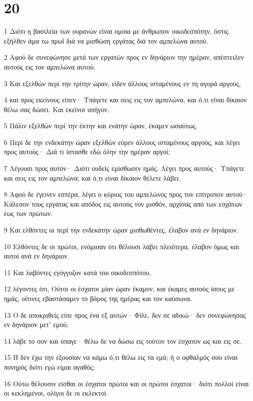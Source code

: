 \chapter{20}

\par 1 Διότι η βασιλεία των ουρανών είναι ομοία με άνθρωπον οικοδεσπότην, όστις εξήλθεν άμα τω πρωΐ διά να μισθώση εργάτας διά τον αμπελώνα αυτού.
\par 2 Αφού δε συνεφώνησε μετά των εργατών προς εν δηνάριον την ημέραν, απέστειλεν αυτούς εις τον αμπελώνα αυτού.
\par 3 Και εξελθών περί την τρίτην ώραν, είδεν άλλους ισταμένους εν τη αγορά αργούς,
\par 4 και προς εκείνους είπεν· Υπάγετε και σεις εις τον αμπελώνα, και ό,τι είναι δίκαιον θέλω σας δώσει. Και εκείνοι υπήγον.
\par 5 Πάλιν εξελθών περί την έκτην και ενάτην ώραν, έκαμεν ωσαύτως.
\par 6 Περί δε την ενδεκάτην ώραν εξελθών εύρεν άλλους ισταμένους αργούς, και λέγει προς αυτούς· Διά τι ίστασθε εδώ όλην την ημέραν αργοί;
\par 7 Λέγουσι προς αυτόν· Διότι ουδείς εμίσθωσεν ημάς. Λέγει προς αυτούς· Υπάγετε και σεις εις τον αμπελώνα, και ό,τι είναι δίκαιον θέλετε λάβει.
\par 8 Αφού δε έγεινεν εσπέρα, λέγει ο κύριος του αμπελώνος προς τον επίτροπον αυτού· Κάλεσον τους εργάτας και απόδος εις αυτούς τον μισθόν, αρχίσας από των εσχάτων έως των πρώτων.
\par 9 Και ελθόντες οι περί την ενδεκάτην ώραν μισθωθέντες, έλαβον ανά εν δηνάριον.
\par 10 Ελθόντες δε οι πρώτοι, ενόμισαν ότι θέλουσι λάβει πλειότερα, έλαβον όμως και αυτοί ανά εν δηνάριον.
\par 11 Και λαβόντες εγόγγυζον κατά του οικοδεσπότου,
\par 12 λέγοντες ότι, Ούτοι οι έσχατοι μίαν ώραν έκαμον, και έκαμες αυτούς ίσους με ημάς, οίτινες εβαστάσαμεν το βάρος της ημέρας και τον καύσωνα.
\par 13 Ο δε αποκριθείς είπε προς ένα εξ αυτών· Φίλε, δεν σε αδικώ· δεν συνεφώνησας εν δηνάριον μετ' εμού;
\par 14 λάβε το σον και ύπαγε· θέλω δε να δώσω εις τούτον τον έσχατον ως και εις σε.
\par 15 Η δεν έχω την εξουσίαν να κάμω ό,τι θέλω εις τα εμά; ή ο οφθαλμός σου είναι πονηρός διότι εγώ είμαι αγαθός;
\par 16 Ούτω θέλουσιν είσθαι οι έσχατοι πρώτοι και οι πρώτοι έσχατοι· διότι πολλοί είναι οι κεκλημένοι, ολίγοι δε οι εκλεκτοί.
